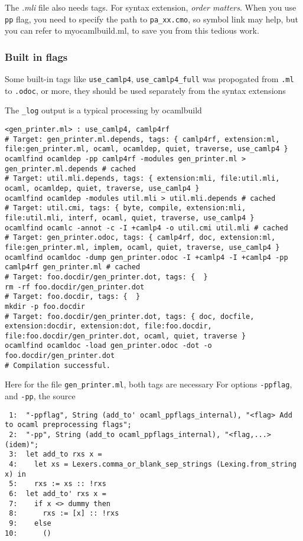 \documentclass[11pt]{article}
\begin{document}
   The \emph{.mli} file also needs tags. For syntax extension, \emph{order    matters}. When you use \texttt{pp} flag, you need to specify the path to
   \texttt{pa\_xx.cmo}, so symbol link may help, but you can refer to
   myocamlbuild.ml, to save you from this tedious work.
\subsubsection*{Built in flags}
\label{sec-1-11-1}

   Some built-in tags like \texttt{use\_camlp4}, \texttt{use\_camlp4\_full} was
   propogated from \texttt{.ml} to \texttt{.odoc}, or more, they should be used
   separately from the syntax extensions

   The \texttt{\_log} output is a typical processing by ocamlbuild



\begin{verbatim}
<gen_printer.ml> : use_camlp4, camlp4rf
# Target: gen_printer.ml.depends, tags: { camlp4rf, extension:ml, file:gen_printer.ml, ocaml, ocamldep, quiet, traverse, use_camlp4 }
ocamlfind ocamldep -pp camlp4rf -modules gen_printer.ml > gen_printer.ml.depends # cached
# Target: util.mli.depends, tags: { extension:mli, file:util.mli, ocaml, ocamldep, quiet, traverse, use_camlp4 }
ocamlfind ocamldep -modules util.mli > util.mli.depends # cached
# Target: util.cmi, tags: { byte, compile, extension:mli, file:util.mli, interf, ocaml, quiet, traverse, use_camlp4 }
ocamlfind ocamlc -annot -c -I +camlp4 -o util.cmi util.mli # cached
# Target: gen_printer.odoc, tags: { camlp4rf, doc, extension:ml, file:gen_printer.ml, implem, ocaml, quiet, traverse, use_camlp4 }
ocamlfind ocamldoc -dump gen_printer.odoc -I +camlp4 -I +camlp4 -pp camlp4rf gen_printer.ml # cached
# Target: foo.docdir/gen_printer.dot, tags: {  }
rm -rf foo.docdir/gen_printer.dot
# Target: foo.docdir, tags: {  }
mkdir -p foo.docdir
# Target: foo.docdir/gen_printer.dot, tags: { doc, docfile, extension:docdir, extension:dot, file:foo.docdir, file:foo.docdir/gen_printer.dot, ocaml, quiet, traverse }
ocamlfind ocamldoc -load gen_printer.odoc -dot -o foo.docdir/gen_printer.dot
# Compilation successful.
\end{verbatim}

   Here for the file \texttt{gen\_printer.ml}, both tags are necessary 
   For options \texttt{-ppflag}, and \texttt{-pp}, the source


\begin{verbatim}
 1:  "-ppflag", String (add_to' ocaml_ppflags_internal), "<flag> Add to ocaml preprocessing flags";
 2:  "-pp", String (add_to ocaml_ppflags_internal), "<flag,...> (idem)";
 3:  let add_to rxs x =
 4:    let xs = Lexers.comma_or_blank_sep_strings (Lexing.from_string x) in
 5:    rxs := xs :: !rxs
 6:  let add_to' rxs x =
 7:    if x <> dummy then
 8:      rxs := [x] :: !rxs
 9:    else
10:      ()
\end{verbatim}
   
\end{document}
